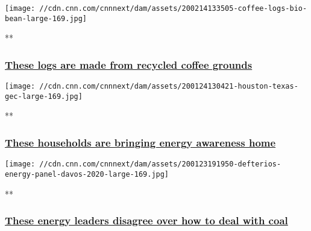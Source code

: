 \href{/videos/business/2020/02/14/coffee-grounds-recycling-gec.cnn-business/video/playlists/business-global-energy-challenge/}{}

\texttt{[image: //cdn.cnn.com/cnnnext/dam/assets/200214133505-coffee-logs-bio-bean-large-169.jpg]}

**

\hypertarget{these-logs-are-made-from-recycled-coffee-grounds}{%
\subsubsection{\texorpdfstring{\href{/videos/business/2020/02/14/coffee-grounds-recycling-gec.cnn-business/video/playlists/business-global-energy-challenge/}{These
logs are made from recycled coffee
grounds}}{These logs are made from recycled coffee grounds}}\label{these-logs-are-made-from-recycled-coffee-grounds}}

\href{/videos/business/2020/01/24/us-household-energy-consumption-gec.cnn-business/video/playlists/business-global-energy-challenge/}{}

\texttt{[image: //cdn.cnn.com/cnnnext/dam/assets/200124130421-houston-texas-gec-large-169.jpg]}

**

\hypertarget{these-households-are-bringing-energy-awareness-home}{%
\subsubsection{\texorpdfstring{\href{/videos/business/2020/01/24/us-household-energy-consumption-gec.cnn-business/video/playlists/business-global-energy-challenge/}{These
households are bringing energy awareness
home}}{These households are bringing energy awareness home}}\label{these-households-are-bringing-energy-awareness-home}}

\href{/videos/business/2020/01/23/energy-panel-john-defterios-davos-lon-orig.cnn-business/video/playlists/business-global-energy-challenge/}{}

\texttt{[image: //cdn.cnn.com/cnnnext/dam/assets/200123191950-defterios-energy-panel-davos-2020-large-169.jpg]}

**

\hypertarget{these-energy-leaders-disagree-over-how-to-deal-with-coal}{%
\subsubsection{\texorpdfstring{\href{/videos/business/2020/01/23/energy-panel-john-defterios-davos-lon-orig.cnn-business/video/playlists/business-global-energy-challenge/}{These
energy leaders disagree over how to deal with
coal}}{These energy leaders disagree over how to deal with coal}}\label{these-energy-leaders-disagree-over-how-to-deal-with-coal}}

